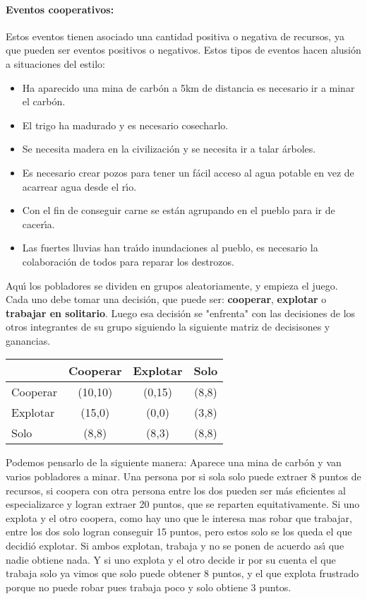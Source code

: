\documentclass{article}
\begin{document}
\paragraph*{Eventos cooperativos:}
Estos eventos tienen asociado una cantidad positiva o negativa de recursos, ya que pueden ser eventos positivos o negativos. Estos tipos de eventos hacen alusi\'on a situaciones del estilo:
\begin{itemize}
    \item Ha aparecido una mina de carb\'on a 5km de distancia es necesario ir a minar el carb\'on.
    \item El trigo ha madurado y es necesario cosecharlo.
    \item Se necesita madera en la civilizaci\'on y se necesita ir a talar \'arboles.
    \item Es necesario crear pozos para tener un f\'acil acceso al agua potable en vez de acarrear agua desde el r\'{\i}o.
    \item Con el fin de conseguir carne se est\'an agrupando en el pueblo para ir de cacer\'{\i}a.
    \item Las fuertes lluvias han tra\'{\i}do inundaciones al pueblo, es necesario la colaboraci\'on de todos para reparar los destrozos.
\end{itemize}
Aqu\'{\i} los pobladores se dividen en grupos aleatoriamente, y empieza el juego. Cada uno debe tomar una decisi\'on, que puede ser: \textbf{cooperar},
\textbf{explotar} o \textbf{trabajar en solitario}. Luego esa decisi\'on se "enfrenta" con las decisiones de los otros integrantes de su grupo siguiendo la
siguiente matriz de decisisones y ganancias.
\vspace*{2mm}
\begin{center}
    \begin{tabular}{|l|c|c|c|}
        \hline
                 & Cooperar & Explotar & Solo  \\
        \hline
        Cooperar & (10,10)  & (0,15)   & (8,8) \\
        \hline
        Explotar & (15,0)   & (0,0)    & (3,8) \\
        \hline
        Solo     & (8,8)    & (8,3)    & (8,8) \\
        \hline
    \end{tabular}
\end{center}
Podemos pensarlo de la siguiente manera: Aparece una mina de carb\'on y van varios pobladores a minar. Una persona por si sola solo
puede extraer 8 puntos de recursos, si coopera con otra persona entre los dos pueden ser m\'as eficientes al especializarce y logran
extraer 20 puntos, que se reparten equitativamente. Si uno explota y el otro coopera, como hay uno que le interesa mas robar que trabajar,
entre los dos solo logran conseguir 15 puntos, pero estos solo se los queda el que decidi\'o explotar. Si ambos explotan, trabaja y no
se ponen de acuerdo as\'{\i} que nadie obtiene nada. Y si uno explota y el otro decide ir por su cuenta el que trabaja solo ya vimos que
solo puede obtener 8 puntos, y el que explota frustrado porque no puede robar pues trabaja poco y solo obtiene 3 puntos.
\end{document}

